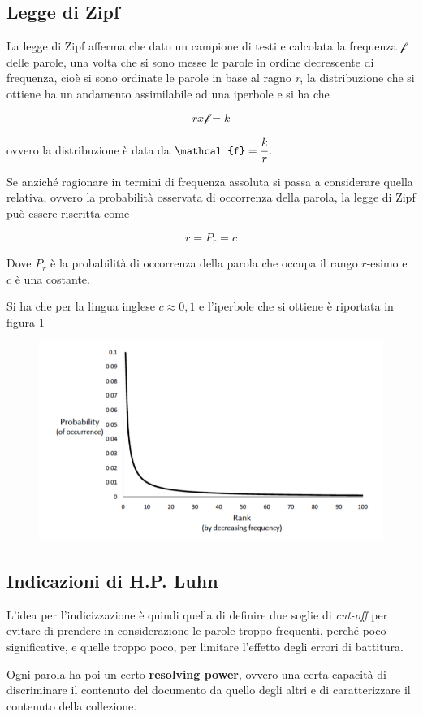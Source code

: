 \subsection{Legge di Zipf}

La legge di Zipf afferma che dato un campione di testi e calcolata la frequenza $\mathcal{f}$ delle parole, una volta che si sono messe le parole in ordine decrescente di frequenza, cioè si sono ordinate le parole in base al ragno \textit{r}, la distribuzione che si ottiene ha un andamento assimilabile ad una iperbole e si ha che

$$
r x \mathcal{f} = k
$$

ovvero la distribuzione è data da $\mathcal{f} = \cfrac{k}{r}$.

Se anziché ragionare in termini di frequenza assoluta si passa a considerare quella relativa, ovvero la probabilità osservata di occorrenza della parola, la legge di Zipf può essere riscritta come 

$$
r = P_r = c
$$

Dove $P_r$ è la probabilità di occorrenza della parola che occupa il rango $r$-esimo e $c$ è una costante.

Si ha che per la lingua inglese $c \approx 0,1$ e l'iperbole che si ottiene è riportata in figura \ref{fig:zipf}

\begin{figure}[htbp]
\centering
\includegraphics[width=0.55\linewidth]{images/l3-zipf}
\label{fig:zipf}
\end{figure}

\subsection{Indicazioni di H.P. Luhn}

L'idea per l'indicizzazione è quindi quella di definire due soglie di \textit{cut-off} per evitare di prendere in considerazione le parole troppo frequenti, perché poco significative, e quelle troppo poco, per limitare l'effetto degli errori di battitura.

Ogni parola ha poi un certo \textbf{resolving power}, ovvero una certa capacità di discriminare il contenuto del documento da quello degli altri e di caratterizzare il contenuto della collezione.

